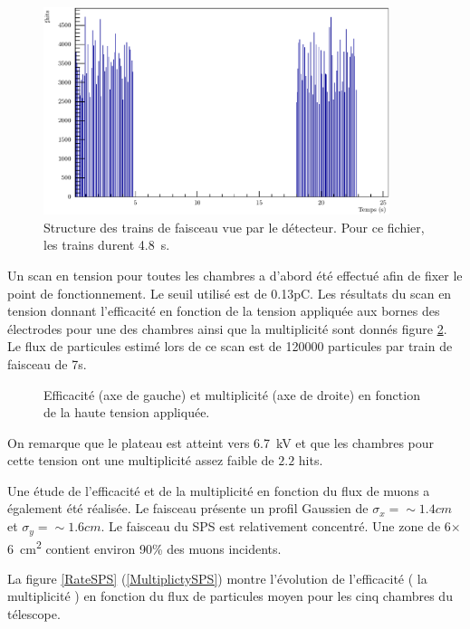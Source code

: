 \begin{figure}[!ht]
	\centering
	\includegraphics[width=0.9\textwidth]{GLA/SpillStructure.pdf}
	\caption{Structure des trains de faisceau vue par le détecteur. Pour ce fichier, les trains durent \SI{4.8}{\second}.}
	\label{StructureSpill}
\end{figure}

Un scan en tension pour toutes les chambres a d'abord été effectué afin de fixer le point de fonctionnement. Le seuil utilisé est de 0.13pC. Les résultats du scan en tension donnant l’efficacité en fonction de la tension appliquée aux bornes des électrodes pour une des chambres ainsi que la multiplicité sont donnés figure \ref{HVSPS}. Le flux de particules estimé lors de ce scan est de \num{120000} particules par train de faisceau de 7s.

\begin{figure}[!ht]
	\centering
	\scalebox{1.4}{}
	\caption{Efficacité (axe de gauche) et multiplicité (axe de droite) en fonction de la haute tension appliquée.}
	\label{HVSPS}
\end{figure}

On remarque que le plateau est atteint vers \SI{6.7}{\kilo\volt} et que les chambres pour cette tension ont une multiplicité assez faible de $2.2$ hits. 

Une étude de l'efficacité et de la multiplicité en fonction du flux de muons a également été réalisée. Le faisceau présente un profil Gaussien de $\sigma_{x}=\sim 1.4cm$ et $\sigma_{y}=\sim 1.6cm$. Le faisceau du SPS est relativement concentré. Une zone de \num{6}$\times$\SI{6}{\square\centi\meter} contient environ 90\% des muons incidents.

La figure \ref{RateSPS} (\ref{MultiplictySPS}) montre l'évolution de l'efficacité ( la multiplicité ) en fonction du flux de particules moyen pour les cinq chambres du télescope.

